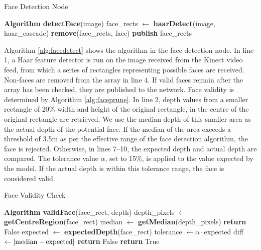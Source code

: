 \documentclass[conference]{IEEEtran}
\begin{document}
\begin{algorithm}
  \caption{Face Detection Node}
  \label{alg:facedetect}
  \begin{algorithmic}[1]
    \State \textbf{Algorithm detectFace}\textnormal{(image)}
    \State face\_rects $\gets$ \textbf{haarDetect}(image, haar\_cascade)
    \State \textbf{remove}(face\_rects, face)
    \EndIf
    \EndFor
    \State \textbf{publish} face\_rects
  \end{algorithmic}
\end{algorithm}
Algorithm \ref{alg:facedetect} shows the algorithm in the face detection node. In line 1, a Haar feature detector is run on the image received from the Kinect video feed, from which a series of rectangles representing possible faces are received. Non-faces are removed from the array in line 4. If valid faces remain after the array has been checked, they are published to the network. Face validity is determined by Algorithm \ref{alg:faceprune}. In line 2, depth values from a smaller rectangle of 20\% width and height of the original rectangle, in the centre of the original rectangle are retrieved. We use the median depth of this smaller area as the actual depth of the potential face. If the median of the area exceeds a threshold of 3.5m as per the effective range of the face detection algorithm, the face is rejected. Otherwise, in lines 7--10, the expected depth and actual depth are compared. The tolerance value $\alpha$, set to 15\%, is applied to the value expected by the model. If the actual depth is within this tolerance range, the face is considered valid.
\begin{algorithm}
  \caption{Face Validity Check}
  \label{alg:faceprune}
  \begin{algorithmic}[1]
    \State \textbf{Algorithm validFace}\textnormal{(face\_rect, depth)}
    \State depth\_pixels $\gets$ \textbf{getCentreRegion}(face\_rect)
    \State median $\gets$ \textbf{getMedian}(depth\_pixels)
    \State \textbf{return} False
    \Else
    \State expected $\gets$ \textbf{expectedDepth}(face\_rect)
    \State tolerance $\gets \alpha \cdot$expected
    \State diff $\gets \left|\textnormal{median}-\textnormal{expected}\right|$
    \State \textbf{return} False
    \EndIf
    \EndIf
    \State \textbf{return} True
  \end{algorithmic}
\end{algorithm}
\end{document}
